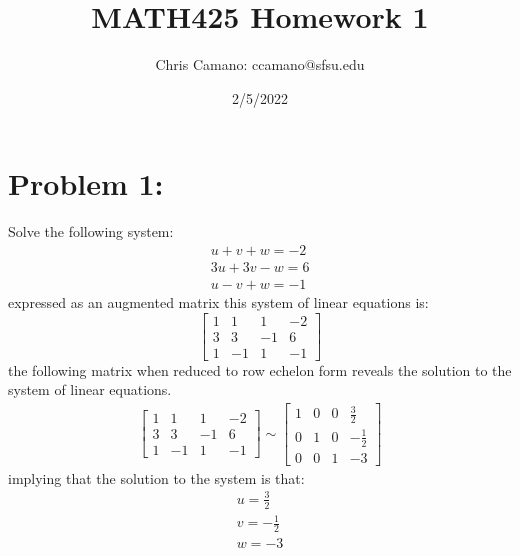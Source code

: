 \documentclass[12pt,a4paper]{article}
\author{Chris Camano: ccamano@sfsu.edu}
\title{MATH425 Homework 1}
\date{2/5/2022}
\begin{document}
\maketitle
\section{Problem 1:}
Solve the following system:
\begin{align*}
  u + v + w = -2\\
  3u + 3v - w = 6\\
  u - v + w =-1
\end{align*}
expressed as an augmented matrix this system of linear equations is:
\[
 \begin{bmatrix}
1 & 1 & 1 & -2 \\
3 & 3 & -1 & 6 \\
1 & -1 & 1 & -1
\end{bmatrix}
\]
the following matrix when reduced to row echelon form reveals the solution to the system of linear equations.
\begin{align*}
  \begin{bmatrix}
 1 & 1 & 1 & -2 \\
 3 & 3 & -1 & 6 \\
 1 & -1 & 1 & -1
 \end{bmatrix} \sim
  \begin{bmatrix}
1 & 0 & 0 & \frac{3}{2} \\
0 & 1 & 0 & -\frac{1}{2} \\
0 & 0 & 1 & -3
\end{bmatrix}
\end{align*}
implying that the solution to the system is that:
\begin{align*}
  u=\frac{3}{2}\\
    v=-\frac{1}{2}\\
   w=-3
\end{align*}
\end{document}
